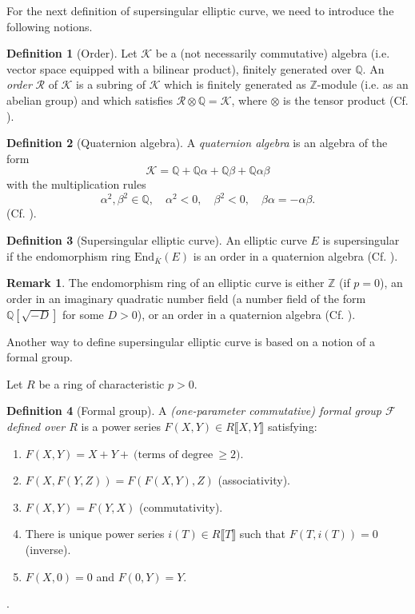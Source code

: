 \documentclass{article}
\theoremstyle{theorem}
\theoremstyle{definition}
\newtheorem{definition}{Definition}
\newtheorem{remark}{Remark}
\begin{document}
For the next definition of supersingular elliptic curve, we need to introduce the following notions. 

\begin{definition}[Order]
	Let $\mathcal{K}$ be a (not necessarily commutative) algebra (i.e. vector space equipped with a bilinear product), finitely generated over $\mathbb{Q}$. An \textit{order} $\mathcal{R}$ of $\mathcal{K}$ is a subring of $\mathcal{K}$ which is finitely generated as $\mathbb{Z}$-module (i.e. as an abelian group) and which satisfies $\mathcal{R} \otimes \mathbb{Q} = \mathcal{K}$, where $\otimes$ is the tensor product (Cf. \cite[III, \S9]{Silverman}).
\end{definition}

\begin{definition}[Quaternion algebra]
	A \textit{quaternion algebra} is an algebra of the form
	\[ \mathcal{K} = \mathbb{Q} +\mathbb{Q}\alpha + \mathbb{Q}\beta +\mathbb{Q}\alpha\beta \]
	with the multiplication rules
	\[ \alpha^2, \beta^2 \in \mathbb{Q}, \quad \alpha^2 < 0, \quad \beta^2 < 0, \quad \beta\alpha = - \alpha\beta. \] (Cf. \cite[III, \S9]{Silverman}).
\end{definition}

\begin{definition}[Supersingular elliptic curve]
	An elliptic curve $E$ is supersingular if the endomorphism		ring $\mathrm{End}_{\bar{K}}(E)$ is an order in a quaternion algebra (Cf. \cite[V, \S3, Theorem 3.1]{Silverman}).
\end{definition}

\begin{remark}
 	The endomorphism ring of an elliptic curve is either $\mathbb{Z}$ (if $p = 0$), an order in an imaginary quadratic number field (a number field of the form $\mathbb{Q}[\sqrt{-D}]$ for some $D > 0$), or an order in a quaternion algebra (Cf. \cite[III, \S, Corollary 9.4]{Silverman}).  
\end{remark}

Another way to define supersingular elliptic curve is based on a notion of a formal group.

Let $R$ be a ring of characteristic $p > 0$.
\begin{definition}[Formal group]
	 A \textit{(one-parameter commutative) formal group $\mathcal{F}$ defined over $R$} is a power series $F(X, Y) \in R\llbracket X, Y \rrbracket $ satisfying:
		\begin{enumerate}
			\item $F(X, Y) = X + Y + \ \text{(terms of degree} \ \geq 2)$.
			\item $F(X, F(Y, Z)) = F(F(X, Y), Z)$ (associativity).
			\item $F(X, Y) = F(Y, X)$ (commutativity).
			\item There is unique power series $i(T) \in R\llbracket T \rrbracket$ such that $F(T, i(T)) = 0$ (inverse).
			\item $F(X, 0) = 0$ and $F(0, Y) = Y$.
		\end{enumerate} \cite[IV, \S2]{Silverman}.
\end{definition}
\end{document}

